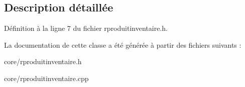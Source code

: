 \subsection{Description détaillée}


Définition à la ligne 7 du fichier rproduitinventaire.h.



La documentation de cette classe a été générée à partir des fichiers suivants :\begin{DoxyCompactItemize}
\item 
core/rproduitinventaire.h\item 
core/rproduitinventaire.cpp\end{DoxyCompactItemize}
